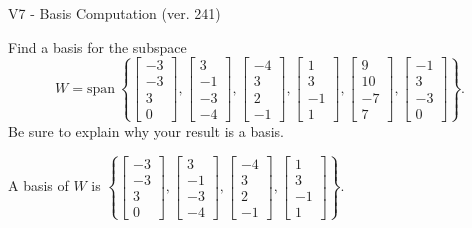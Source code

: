 \begin{exercise}
  \begin{exerciseTitle}V7 - Basis Computation (ver. 241)\end{exerciseTitle}
  \begin{exerciseStatement}
    Find a basis for the subspace 
\[W=\mathrm{span}\ \left\{\left[\begin{array}{r}
-3 \\
-3 \\
3 \\
0
\end{array}\right] , \left[\begin{array}{r}
3 \\
-1 \\
-3 \\
-4
\end{array}\right] , \left[\begin{array}{r}
-4 \\
3 \\
2 \\
-1
\end{array}\right] , \left[\begin{array}{r}
1 \\
3 \\
-1 \\
1
\end{array}\right] , \left[\begin{array}{r}
9 \\
10 \\
-7 \\
7
\end{array}\right] , \left[\begin{array}{r}
-1 \\
3 \\
-3 \\
0
\end{array}\right]\right\}.\]
 Be sure to explain why your result is a basis.


  \end{exerciseStatement}
  \begin{exerciseAnswer}
   A basis of \(W\) is  \(\left\{\left[\begin{array}{r}
-3 \\
-3 \\
3 \\
0
\end{array}\right] , \left[\begin{array}{r}
3 \\
-1 \\
-3 \\
-4
\end{array}\right] , \left[\begin{array}{r}
-4 \\
3 \\
2 \\
-1
\end{array}\right] , \left[\begin{array}{r}
1 \\
3 \\
-1 \\
1
\end{array}\right]\right\}\).
  


  \end{exerciseAnswer}
\end{exercise}
